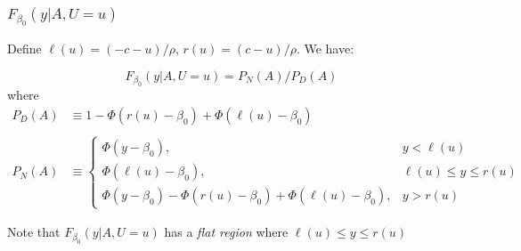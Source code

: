 \begin{frame}
  \frametitle{$F_{\beta_0}(y|A,U=u)$}

  \footnotesize
    Define $\ell(u) = (-c -u)/\rho$, $r(u) = (c - u)/\rho$. We have:

    \[F_{\beta_0}(y|A,U=u) = P_N(A) / P_D(A) \]
where
  \begin{align*}
    P_D(A) &\equiv 1 - \Phi\left( r(u) - \beta_0 \right) + \Phi\left( \ell(u) - \beta_0 \right)\\ \\
    P_N(A) &\equiv  \left\{
 \begin{array}{lr}
   \Phi\left( y - \beta_0 \right), & y < \ell(u) \\
   \Phi\left(\ell(u) - \beta_0 \right), &  \ell(u) \leq y \leq r(u) \\
   \Phi(y - \beta_0) - \Phi\left( r(u) - \beta_0 \right) + \Phi\left(\ell(u) - \beta_0 \right), & y > r(u) 
 \end{array}
 \right.
  \end{align*}

  \vspace{1em}

  \alert{Note that $F_{\beta_0}(y|A,U=u)$ has a \emph{flat region} where $\ell(u) \leq y \leq r(u)$}
\end{frame}

